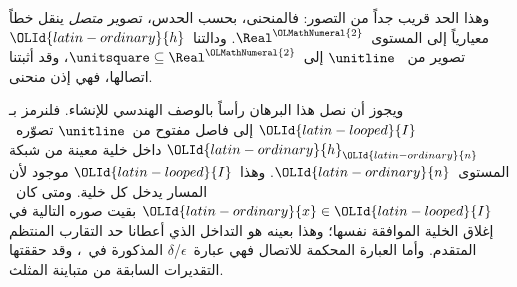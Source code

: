 \documentclass[../../../include/open-logic-section]{subfiles}
\begin{document}
وهذا الحد قريب جداً من التصور: فالمنحنى، بحسب الحدس، تصوير \emph{متصل}
ينقل خطاً معيارياً إلى المستوى~$\Real^\OLMathNumeral{2}$. ودالتنا~$\OLId{latin-ordinary}{h}$ تصوير من
~$\unitline$ إلى~$\unitsquare \subseteq \Real^\OLMathNumeral{2}$، وقد أثبتنا اتصالها،
فهي إذن منحنى.

ويجوز أن نصل هذا البرهان رأساً بالوصف الهندسي للإنشاء. فلنرمز بـ$\OLId{latin-looped}{I}$ إلى
فاصل مفتوح من~$\unitline$ تصوّره~$\OLId{latin-ordinary}{h}_\OLId{latin-ordinary}{n}$ داخل خلية معينة من شبكة
المستوى~$\OLId{latin-ordinary}{n}$. وهذا~$\OLId{latin-looped}{I}$ موجود لأن المسار يدخل كل خلية. ومتى كان~$\OLId{latin-ordinary}{x} \in \OLId{latin-looped}{I}$
بقيت صوره التالية في إغلاق الخلية الموافقة نفسها؛ وهذا بعينه هو التداخل
الذي أعطانا حد التقارب المنتظم المتقدم. وأما العبارة المحكمة للاتصال فهي
عبارة~$\epsilon$/$\delta$ المذكورة في~، وقد حققتها
التقديرات السابقة من متباينة المثلث.
\end{document}
